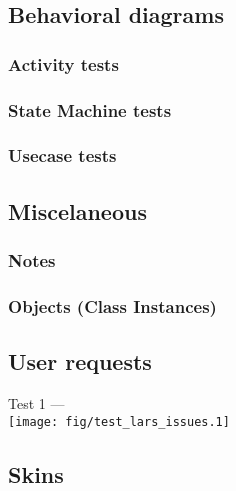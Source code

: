 \subsection{Behavioral diagrams}
  \subsubsection{Activity tests}

  \subsubsection{State Machine tests}

  \subsubsection{Usecase tests}

\subsection{Miscelaneous}
  \subsubsection{Notes}
  \subsubsection{Objects (Class Instances)}

\subsection{User requests}
  Test 1 --- \\ \texttt{[image: fig/test\_lars\_issues.1]} \\

\subsection{Skins}
